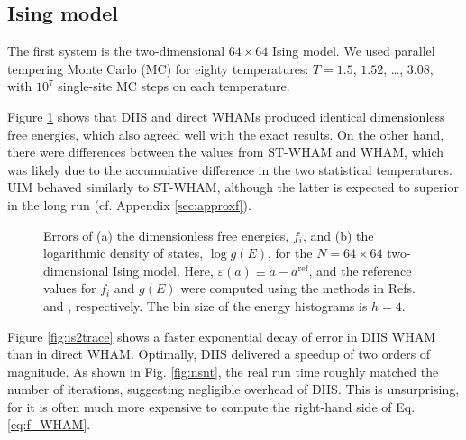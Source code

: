 \documentclass[reprint,aip,jcp,superscriptaddress]{revtex4-1}
\begin{document}
\subsection{\label{sec:results_Ising}
Ising model}





The first system is
the two-dimensional $64\times64$ Ising model.
%
We used parallel tempering\cite{
swendsen1986, *geyer1991, *hukushima1996, *hansmann1997, *earl2005}
Monte Carlo (MC)
for
eighty temperatures: $T = 1.5$, $1.52$, \dots, $3.08$,
with $10^7$ single-site MC steps on each temperature.



Figure \ref{fig:is2ref} shows that
DIIS and direct WHAMs produced identical
dimensionless free energies, which also
agreed well with the exact results\cite{
ferdinand1969}.
%
On the other hand,
there were differences between
the values from ST-WHAM and WHAM,
which was likely due to
the accumulative difference
in the two statistical temperatures.
%
UIM behaved similarly to ST-WHAM,
although the latter is expected to superior
in the long run (cf. Appendix \ref{sec:approxf}).



\begin{figure}[h]
  \caption{
    \label{fig:is2ref}
    Errors of
    (a) the dimensionless free energies, $f_i$, and
    (b) the logarithmic density of states, $\log g(E)$,
    for the $N = 64\times64$ two-dimensional Ising model.
    Here,
    $\varepsilon(a) \equiv a - a^\mathrm{ref}$,
    and the reference values for $f_i$ and $g(E)$
    were computed using the methods in
    Refs.  and ,
    respectively.
    The bin size of the energy histograms is $h = 4$.
  }
\end{figure}




Figure \ref{fig:is2trace}
shows a faster exponential decay of error
in DIIS WHAM
than in direct WHAM.
%
Optimally, DIIS
delivered a speedup of two orders of magnitude.
%
As shown in Fig. \ref{fig:nsnt},
the real run time roughly matched
the number of iterations,
suggesting negligible overhead of DIIS.
%
This is unsurprising,
for it is often much more expensive to compute
the right-hand side of Eq. \eqref{eq:f_WHAM}.
\end{document}
